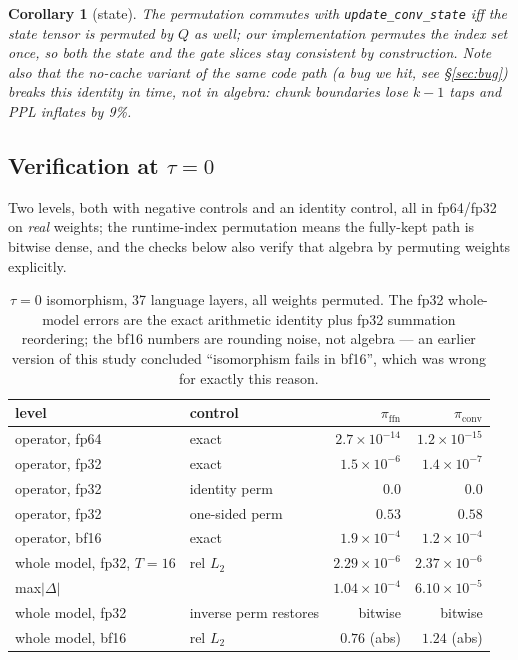\documentclass[11pt]{article}
\newtheorem{corollary}{Corollary}
\newcommand{\pif}{\pi_{\mathrm{ffn}}}
\newcommand{\pic}{\pi_{\mathrm{conv}}}
\newcommand{\code}[1]{\texttt{\small #1}}
\begin{document}
\begin{corollary}[state]
The permutation commutes with \code{update\_conv\_state} iff the state tensor is permuted
by $Q$ as well; our implementation permutes the index set once, so both the state and the
gate slices stay consistent by construction. Note also that the \emph{no-cache} variant of
the same code path (a bug we hit, see \S\ref{sec:bug}) breaks this identity in time, not
in algebra: chunk boundaries lose $k{-}1$ taps and PPL inflates by 9\%.
\end{corollary}

\subsection{Verification at $\tau=0$}
Two levels, both with negative controls and an identity control, all in fp64/fp32 on
\emph{real} weights; the runtime-index permutation means the fully-kept path is bitwise
dense, and the checks below also verify that algebra by permuting weights explicitly.

\begin{table}[h]\centering\small
\begin{tabular}{llrr}
\toprule
level & control & $\pif$ & $\pic$ \\
\midrule
operator, fp64 & exact & $2.7\times10^{-14}$ & $1.2\times10^{-15}$ \\
operator, fp32 & exact & $1.5\times10^{-6}$ & $1.4\times10^{-7}$ \\
operator, fp32 & identity perm & $0.0$ & $0.0$ \\
operator, fp32 & one-sided perm & $0.53$ & $0.58$ \\
operator, bf16 & exact & $1.9\times10^{-4}$ & $1.2\times10^{-4}$ \\
whole model, fp32, $T{=}16$ & rel $L_2$ & $2.29\times10^{-6}$ & $2.37\times10^{-6}$ \\
\quad max$|\Delta|$ & & $1.04\times10^{-4}$ & $6.10\times10^{-5}$ \\
whole model, fp32 & inverse perm restores & bitwise & bitwise \\
whole model, bf16 & rel $L_2$ & $0.76$ (abs) & $1.24$ (abs) \\
\bottomrule
\end{tabular}
\caption{$\tau{=}0$ isomorphism, 37 language layers, all weights permuted. The fp32
whole-model errors are the exact arithmetic identity plus fp32 summation reordering; the
bf16 numbers are rounding noise, not algebra --- an earlier version of this study
concluded ``isomorphism fails in bf16'', which was wrong for exactly this reason.}
\end{table}
\end{document}
